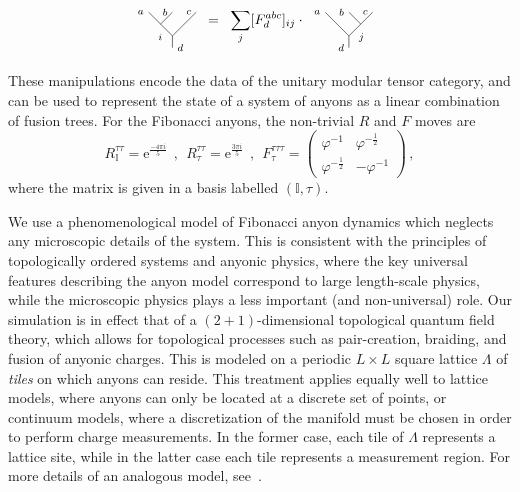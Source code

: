\documentclass[aps, prl, letterpaper, twocolumn, superscriptaddress, notitlepage, 10pt]{revtex4-1}
\newcommand{\e}{\mathrm{e}}
\begin{document}
	\begin{align}
		\label{e:fmove}
		\begin{tikzpicture}[baseline=0.6cm,scale=0.3]
			\draw(0,0)--(0,1)--(-2,3);
			\draw(0,3)--(-1,2);
			\draw(2,3)--(0,1);
			\node at (-0.45,1.6) [anchor=north east] {{\scriptsize $i$}};
			\node at (0,0) [anchor=west] {{\scriptsize $d$}};
			\node at (2,3) [anchor=east] {{\scriptsize $c$}};
			\node at (0,3) [anchor=east] {{\scriptsize $b$}};
			\node at (-2,3) [anchor=east] {{\scriptsize $a$}};
		\end{tikzpicture}
		&\;\;=\;\;\sum_j[F^{abc}_d]_{ij}\cdot\;
		\begin{tikzpicture}[baseline=0.6cm,scale=0.3]		
			\draw(0,0)--(0,1)--(-2,3);
			\draw(0,3)--(1,2);
			\draw(2,3)--(0,1);
			\node at (0.42,1.63) [anchor=north west] {{\scriptsize $j$}};
			\node at (0,0) [anchor=east] {{\scriptsize $d$}};
			\node at (2,3) [anchor=east] {{\scriptsize $c$}};
			\node at (0,3) [anchor=east] {{\scriptsize $b$}};
			\node at (-2,3) [anchor=east] {{\scriptsize $a$}};
		\end{tikzpicture}
	\end{align}

These manipulations encode the data of the unitary modular tensor category, and can be used to represent the state of a system of anyons as a linear combination of fusion trees. For the Fibonacci anyons, the non-trivial $R$ and $F$ moves are 
\begin{equation*}
	R_{\mathbb{I}}^{\tau\tau} = \e^{\frac{-4\pi i}{5}} 
	\ \ , \ \
	R_\tau^{\tau\tau}= \e^{\frac{3\pi i}{5}} 
	\ \ , \ \
	F_{\tau}^{\tau\tau\tau} = \begin{pmatrix}\varphi^{-1}&\varphi^{-\frac{1}{2}}\\\varphi^{-\frac{1}{2}}&-\varphi^{-1}\end{pmatrix} \,,
\end{equation*}
where the matrix is given in a basis labelled $(\mathbb{I},\tau)$.

We use a phenomenological model of Fibonacci anyon dynamics which neglects any 
microscopic details of the system. 
This is consistent with the principles of topologically 
ordered systems and anyonic physics, where the key universal features describing the 
anyon model correspond to large length-scale physics, while the microscopic physics plays 
a less important (and non-universal) role.
Our simulation is in effect that of a $(2+1)$-dimensional topological quantum field theory, which allows for topological processes such as pair-creation, braiding, and fusion of anyonic charges. 
This is modeled on a periodic $L\times L$ square lattice $\Lambda$ of \emph{tiles} on which anyons can reside. 
This treatment applies equally well to lattice models, where anyons can only be located at a discrete set of points, or continuum models, where a discretization of the manifold must be chosen in order to perform charge measurements. 
In the former case, each tile of $\Lambda$ represents a lattice site, while in the latter case each tile represents a measurement region. For more details of an analogous model, see~\cite{Brell2013}.
\end{document}
